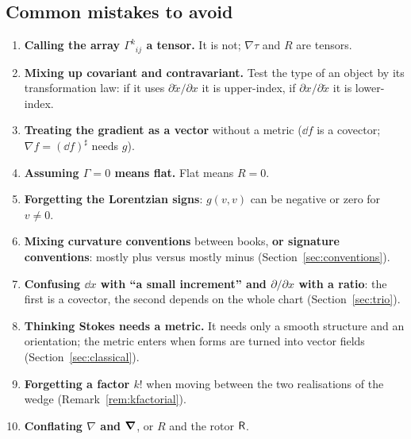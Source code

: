 \subsection{Common mistakes to avoid}
\begin{enumerate}
\item \textbf{Calling the array $\Gamma^k{}_{ij}$ a tensor.} It is not; $\nabla\tau$ and $R$ are tensors.
\item \textbf{Mixing up covariant and contravariant.} Test the type of an object by its transformation law: if it uses $\partial\tilde x/\partial x$ it is upper-index, if $\partial x/\partial\tilde x$ it is lower-index.
\item \textbf{Treating the gradient as a vector} without a metric ($\dd f$ is a covector; $\nabla f=(\dd f)^\sharp$ needs $g$).
\item \textbf{Assuming $\Gamma=0$ means flat.} Flat means $R=0$.
\item \textbf{Forgetting the Lorentzian signs}: $g(v,v)$ can be negative or zero for $v\neq0$.
\item \textbf{Mixing curvature conventions} between books, \textbf{or signature conventions}: mostly plus versus mostly minus (Section~\ref{sec:conventions}).
\item \textbf{Confusing $\dd x$ with ``a small increment'' and $\partial/\partial x$ with a ratio}: the first is a covector, the second depends on the whole chart (Section~\ref{sec:trio}).
\item \textbf{Thinking Stokes needs a metric.} It needs only a smooth structure and an orientation; the metric enters when forms are turned into vector fields (Section~\ref{sec:classical}).
\item \textbf{Forgetting a factor $k!$} when moving between the two realisations of the wedge (Remark~\ref{rem:kfactorial}).
\item \textbf{Conflating $\nabla$ and $\boldsymbol{\nabla}$}, or $R$ and the rotor $\mathsf{R}$.
\end{enumerate}
